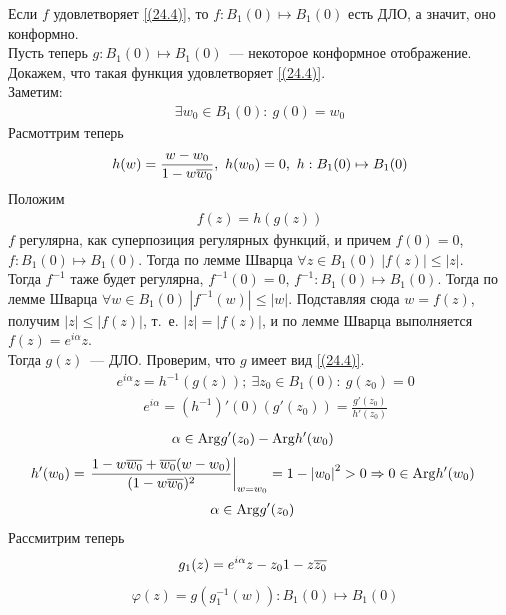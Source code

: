 \pr
Если $f$ удовлетворяет \eqref{(24.4)}, то $f: B_1(0) \mapsto B_1(0)$ есть ДЛО, а
значит, оно конформно.
\\
Пусть теперь $g: B_1(0) \mapsto B_1(0)$~--- некоторое конформное отображение.
Докажем, что такая функция удовлетворяет \eqref{(24.4)}.
\\
Заметим:
\begin{align*}
  \exists w_0 \in B_1(0): \ g(0) = w_0
\end{align*}
Расмоттрим теперь
\begin{align*}
  h(w) = \frac{w-w_0}{1-w\overline{w_0}}, \ h(w_0) = 0, \ h:B_1(0)\mapsto B_1(0)
\end{align*}
Положим
\begin{align*}
  f(z) = h(g(z))
\end{align*}
$f$ регулярна, как суперпозиция регулярных функций, и причем $f(0) = 0$,
$f:B_1(0) \mapsto B_1(0)$. Тогда по лемме Шварца $\forall z \in B_1(0) \ \left|
    f(z) \right|\leq \left| z \right|$.
\\
Тогда $f^{-1}$ таже будет регулярна, $f^{-1}(0) = 0$, $f^{-1}: B_1(0) \mapsto
B_1(0)$. Тогда по лемме Шварца $\forall w \in B_1(0) \ \left| f^{-1}(w)
\right|\leq \left| w \right|$. Подставляя сюда $w = f(z)$, получим $\left| z
\right| \leq \left| f(z) \right|$, т.~е. $\left| z \right| = \left| f(z)
\right|$, и по лемме Шварца выполняется $f(z) = e^{i\alpha}z$.
\\
Тогда $g(z)$~--- ДЛО. Проверим, что $g$ имеет вид \eqref{(24.4)}.
\begin{align*}
& e^{i\alpha}z = h^{-1}(g(z)); \ \exists z_0 \in B_1(0): \ g(z_0) = 0
\end{align*}
\begin{align*}
& e^{i\alpha} = (h^{-1})'(0)(g'(z_0)) = \frac{g'(z_0)}{h'(z_0)}
\end{align*}
\begin{align*}
& \alpha \in \mathrm{Arg} g'(z_0) - \mathrm{Arg} h'(w_0)
\end{align*}
\begin{align*}
& h'(w_0) = \left.\frac{1-w\overline{w_0}+\overline{w_0}(w-w_0)}{(1-w\overline{w_0})^2}\right|_{w=w_0} = 1 - \left| w_0 \right|^2 > 0 \Rightarrow 0 \in \mathrm{Arg} h'(w_0)
\end{align*}
\begin{align*}
& \alpha \in \mathrm{Arg} g'(z_0)
\end{align*}
Рассмитрим теперь 
\begin{align*}
& g_1(z) = e^{i\alpha}{z-z_0}{1-z\overline{z_0}}
\end{align*}
\begin{align*}
&\varphi(z) = g(g_1^{-1}(w)): B_1(0) \mapsto B_1(0)
\end{align*}
